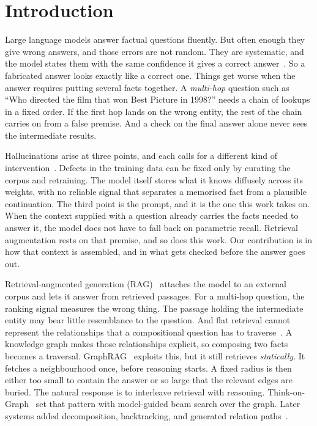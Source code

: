 %
\section{Introduction}\label{sec:intro}

Large language models answer factual questions fluently. But
often enough they give wrong answers, and those errors are not random. They are
systematic, and the model states them with the same confidence it gives a
correct answer~\cite{huang2025survey}. So a fabricated answer looks exactly like
a correct one. Things get worse when the answer requires putting several facts
together. A \emph{multi-hop} question such as ``Who directed the film that won
Best Picture in 1998?'' needs a chain of lookups in a fixed order. If the first
hop lands on the wrong entity, the rest of the chain carries on from a false
premise. And a check on the final answer alone never sees the intermediate
results.

Hallucinations arise at three points, and each calls for a different kind of
intervention~\cite{huang2025survey}. Defects in the training data can be fixed
only by curating the corpus and retraining. The model itself stores what it
knows diffusely across its weights, with no reliable signal that separates a
memorised fact from a plausible continuation. The third point is the prompt, and
it is the one this work takes on. When the context supplied with a question
already carries the facts needed to answer it, the model does not have to fall
back on parametric recall. Retrieval augmentation rests on that premise, and so
does this work. Our contribution is in how that context is assembled, and in
what gets checked before the answer goes out.

Retrieval-augmented generation (RAG)~\cite{lewis2020retrieval} attaches the
model to an external corpus and lets it answer from retrieved passages. For a
multi-hop question, the ranking signal measures the wrong thing. The passage
holding the intermediate entity may bear little resemblance to the question. And
flat retrieval cannot represent the relationships that a compositional question
has to traverse~\cite{li2023survey}. A knowledge graph makes those relationships
explicit, so composing two facts becomes a traversal.
GraphRAG~\cite{edge2024local} exploits this, but it still retrieves
\emph{statically}. It fetches a neighbourhood once, before reasoning starts. A
fixed radius is then either too small to contain the answer or so large that the
relevant edges are buried. The natural response is to interleave retrieval with
reasoning. Think-on-Graph~\cite{sun2024think} set that pattern with model-guided
beam search over the graph. Later systems added decomposition, backtracking, and
generated relation paths~\cite{chen2024plan,luo2024reasoning}.

